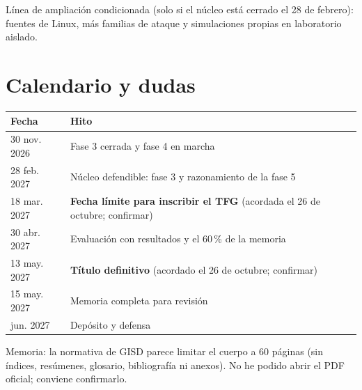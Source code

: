 \documentclass[11pt,a4paper]{article}
\begin{document}
{\small\color{gris} Línea de ampliación condicionada (solo si el núcleo está cerrado el 28 de febrero): fuentes de
Linux, más familias de ataque y simulaciones propias en laboratorio aislado.}

\section{Calendario y dudas}
\begin{center}
\small
\begin{tabular}{@{}l l@{}}
\toprule
\textbf{Fecha} & \textbf{Hito} \\
\midrule
30 nov. 2026 & Fase 3 cerrada y fase 4 en marcha \\
28 feb. 2027 & Núcleo defendible: fase 3 y razonamiento de la fase 5 \\
18 mar. 2027 & \textbf{Fecha límite para inscribir el TFG} (acordada el 26 de octubre; confirmar) \\
30 abr. 2027 & Evaluación con resultados y el 60\,\% de la memoria \\
13 may. 2027 & \textbf{Título definitivo} (acordado el 26 de octubre; confirmar) \\
15 may. 2027 & Memoria completa para revisión \\
jun. 2027 & Depósito y defensa \\
\bottomrule
\end{tabular}
\end{center}

{\small\color{gris} Memoria: la normativa de GISD parece limitar el cuerpo a 60 páginas (sin índices, resúmenes,
glosario, bibliografía ni anexos). No he podido abrir el PDF oficial; conviene confirmarlo.}
\end{document}
